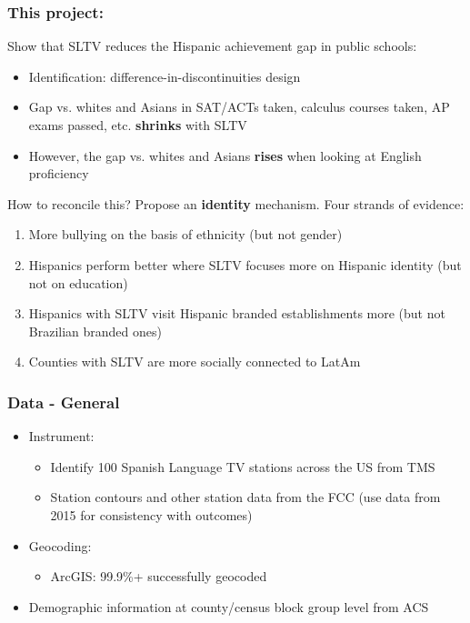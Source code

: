 \documentclass{beamer}
\begin{document}
\begin{frame}
\frametitle{This project:}

Show that SLTV reduces the Hispanic achievement gap in public schools:
\begin{itemize}
\item Identification: difference-in-discontinuities design
\item Gap vs. whites and Asians in SAT/ACTs taken, calculus courses taken, AP exams passed, etc. \textbf{shrinks} with SLTV
\item However, the gap vs. whites and Asians \textbf{rises} when looking at English proficiency
\end{itemize}

How to reconcile this?
\pause 
Propose an \textbf{identity} mechanism. Four strands of evidence:

\begin{enumerate}
\item More bullying on the basis of ethnicity (but not gender)

\item Hispanics perform better where SLTV focuses more on Hispanic identity (but not on education)

\item Hispanics with SLTV visit Hispanic branded establishments more (but not Brazilian branded ones)

\item Counties with SLTV are more socially connected to LatAm
\end{enumerate}

\end{frame}


\begin{frame}
\frametitle{Data - General}

\begin{itemize}
\item Instrument:
\begin{itemize}
\item Identify 100 Spanish Language TV stations across the US from TMS
\item Station contours and other station data from the FCC (use data from 2015 for consistency with outcomes)
\end{itemize}
\item Geocoding:
\begin{itemize}
\item ArcGIS: 99.9\%+ successfully geocoded
\end{itemize}
\item Demographic information at county/census block group level from ACS
\end{itemize}

\end{frame}
\end{document}
